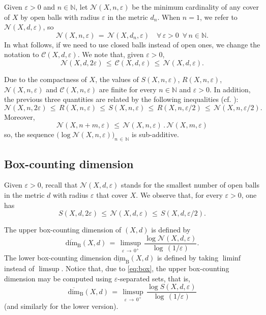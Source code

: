 \documentclass[11pt,a4paper,reqno]{amsart}
\theoremstyle{plain}
\theoremstyle{definition}
\newcommand{\vep}{\varepsilon}
\begin{document}
Given $\vep >0$ and $n \in \mathbb{N}$, let $\mathcal{N}(X,n,\vep)$ be the minimum cardinality of any cover of $X$ by open balls with radius $\vep$ in the metric $d_n$. When $n=1$, we refer to $\mathcal{N}(X,d,\vep)$, so
$$\mathcal{N}(X, n, \vep) \,=\, \mathcal{N}(X, d_n,\vep) \quad \forall \,\vep>0 \,\,\,\forall\, n\in\mathbb{N}.$$
In what follows, if we need to use closed balls instead of open ones, we change the notation to $\mathcal{C}(X,d,\vep)$. We note that, given $\vep > 0$,
\begin{equation}\label{eq:NC}
\mathcal{N}(X,d,2\vep)\,\leq\, \mathcal{C}(X,d,\vep)\, \leq \, \mathcal{N}(X,d,\vep). 
\end{equation} 

Due to the compactness of $X$, the values of $S(X,n,\varepsilon)$, $R(X,n,\varepsilon)$, $\mathcal{N}(X,n,\vep)$ and $\mathcal{C}(X,n,\vep)$ are finite for every $n\in\mathbb{N}$ and $\vep>0$. In addition, the previous three quantities are related by the following inequalities (cf. \cite[\S 7]{Wa}):
\begin{equation}\label{eq:srn} 
\mathcal{N}(X,n,2\vep) \, \leq \, R(X,n,\vep) \, \leq \, S(X,n,\vep)\, \leq \, R(X,n,\vep/2) \, \leq \, \mathcal{N}(X,n,\vep/2).    
\end{equation}
Moreover, 
\begin{equation}\label{eq:cov} 
\mathcal{N}(X,n+m,\vep) \, \leq \, \mathcal{N}(X,n,\vep)\, . \, \mathcal{N}(X,m,\vep)
\end{equation}
so, the sequence $\big(\log \mathcal{N}(X,n,\vep)\big)_{n\, \in\, \mathbb{N}}$ is sub-additive.


\subsection{Box-counting dimension}\label{sse:boxdim}

Given $\vep > 0$, recall that $\mathcal{N}(X,d,\vep)$ stands for the smallest number of open balls in the metric $d$ with radius $\vep$ that cover $X$. We observe that, for every $\vep >0$, one has
\begin{equation}\label{eq:box}
S(X,d,2\vep) \, \leq \, \mathcal{N}(X,d,\vep) \, \leq\, S(X,d, \vep/2).
\end{equation}

The upper box-counting dimension of $(X,d)$ is defined by
$$\mathrm{\overline{dim}_B}(X,d) \,=\, \limsup_{\vep \, \to \, 0^+}\,\frac{\log \mathcal{N}(X,d,\vep)}{\log\,(1/\varepsilon)}.$$
The lower box-counting dimension $\mathrm{\underline{dim}_B}(X,d)$ is defined by taking $\liminf$ instead of $\limsup$. Notice that, due to \eqref{eq:box}, the upper box-counting dimension may be computed using $\vep$-separated sets, that is,
$$\mathrm{\overline{dim}_B}(X,d) \,=\, \limsup_{\vep \, \to \, 0^+}\,\frac{\log S(X,d,\vep)}{\log\,(1/\varepsilon)}$$
(and similarly for the lower version).
\end{document}
